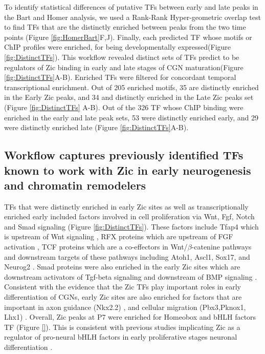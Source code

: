 \documentclass[fleqn,10pt]{wlscirep}
\begin{document}
To identify statistical differences of putative TFs between early and late peaks in the Bart and Homer analysis, we used a Rank-Rank Hyper-geometric  overlap test to find TFs that are the distinctly enriched between peaks from the two time points (Figure \ref{fig:HomerBart}F,J). Finally, each predicted TF whose motifs or ChIP profiles were enriched, for being developmentally expressed(Figure \ref{fig:DistinctTFs}). This workflow revealed distinct sets of TFs predict to be regulators of Zic binding in early and late stages of CGN maturation(Figure \ref{fig:DistinctTFs}A-B). Enriched TFs were filtered for concordant temporal transcriptional enrichment. Out of 205 enriched motifs, 35 are distinctly enriched in the Early Zic peaks, and 34 and distinctly enriched in the Late Zic peaks set (Figure \ref{fig:DistinctTFs} A-B). Out of the 326 TF whose ChIP binding were enriched in the early and late peak sets, 53 were distinctly enriched early, and 29 were distinctly enriched late (Figure \ref{fig:DistinctTFs}A-B).  

\subsection*{Workflow captures previously identified TFs known to work with Zic in early neurogenesis and chromatin remodelers}
TFs that were distinctly enriched in early Zic sites as well as transcriptionally enriched early included factors involved in cell proliferation via Wnt, Fgf, Notch and Smad signaling (Figure \ref{fig:DistinctTFs}). These factors include Tfap4 which is upstream  of Wnt signaling \cite{Medina-Martinez2020TheDevelopment, Song2018TranscriptionCarcinoma}, RFX proteins which are upstream of FGF activation \cite{Hsu2012CiliogenicPromoter}, TCF proteins \cite{Shy2013RegulationSignaling} which are a co-effectors in  Wnt/$\beta$-catenine pathways and downstream targets of these pathways including  Atoh1, Ascl1, Sox17, and Neurog2 \cite{Dennis2019BHLHReprogramming, Zhu2019pBCL11ACancer/p, Lacomme2012NEUROG2Cycle, Katoh2018MultilayeredReview, Lebensohn2016ComparativeSignaling}. Smad proteins were also enriched in the early Zic sites which are downstream activators of Tgf-beta signaling and downstream of BMP signaling \cite{Liu2021SMAD4Pathways, Nickel2019SpecificationSignaling, Derynck2003Smad-dependentsignaling}. Consistent with the evidence that the Zic TFs play important roles in early differentiation of CGNs,
early Zic sites are also enriched for factors that are important in axon guidance (Nkx2.2) \cite{}, and cellular migration (Pbx3,Pknox1, Lhx1) \cite{}. Overall, Zic peaks at P7 were enriched for Homeobox and bHLH factors TF (Figure \ref{}). This is consistent with previous studies implicating Zic as a regulator of pro-neural bHLH factors in early proliferative stages neuronal differentiation \cite{Aruga2018ZicDisease}.
\end{document}
